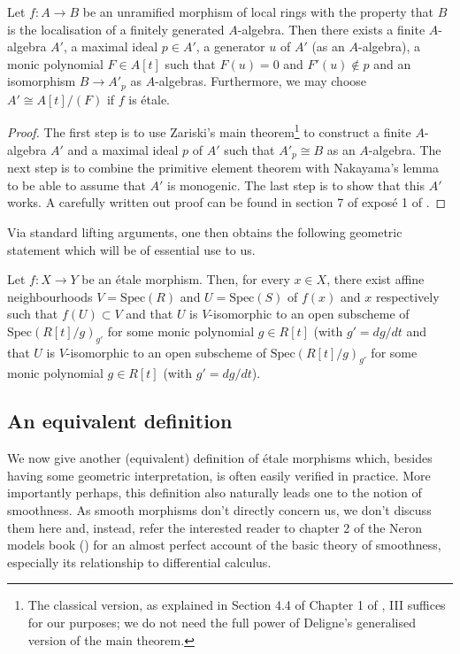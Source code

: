 \begin{theorem}
\label{theorem-structure-etale}
Let $f:A \to B$ be an unramified morphism of local rings with the property
that $B$ is the localisation of a finitely generated $A$-algebra. Then there
exists a finite $A$-algebra $A'$, a maximal ideal $p \in A'$, a generator
$u$ of $A'$ (as an $A$-algebra), a monic polynomial $F \in A[t]$ such that
$F(u) = 0$ and $F'(u) \notin p$ and an isomorphism $B \to A'_p$ as
$A$-algebras. Furthermore, we may choose $A' \cong A[t]/(F)$ if $f$
is \'etale.
\end{theorem}

\begin{proof}
The first step is to use Zariski's main
theorem\footnote{The classical version, as explained in Section 4.4 of
Chapter 1 of \cite{EGA}, III suffices for our purposes; we do not need the
full power of Deligne's generalised version of the main theorem.} to
construct a finite $A$-algebra $A'$ and a maximal ideal $p$ of $A'$ such
that $A'_p \cong B$ as an $A$-algebra. The next step is to combine the
primitive element theorem with Nakayama's lemma to be able to assume that
$A'$ is monogenic. The last step is to show that this $A'$ works. A
carefully written out proof can be found in section 7 of expos\'e 1 of
\cite{SGA1}.
\end{proof}

\noindent
Via standard lifting arguments, one then obtains the following geometric
statement which will be of essential use to us.

\begin{theorem}
\label{theorem-geometric-structure}
Let $f:X \to Y$ be an \'etale morphism. Then, for every $x \in X$, there
exist affine neighbourhoods $V = \text{Spec}(R)$ and $U = \text{Spec}(S)$ of $f(x)$
and $x$ respectively such that $f(U) \subset V$ and that $U$ is $V$-isomorphic
to an open subscheme of $\text{Spec}(R[t]/g)_{g'}$ for some monic polynomial
$g \in R[t]$  (with $g' = dg/dt$ and that $U$ is $V$-isomorphic to an open
subscheme of $\text{Spec}(R[t]/g)_{g'}$ for some monic polynomial $g \in R[t]$
(with $g' = dg/dt$).
\end{theorem}

\subsection{An equivalent definition}
\label{subsection-definition-equivalent}

\noindent
We now give another (equivalent) definition of \'etale morphisms which,
besides having some geometric interpretation, is often easily verified in
practice. More importantly perhaps, this definition also naturally leads
one to the notion of smoothness. As smooth morphisms don't directly concern
us, we don't discuss them here and, instead, refer the interested reader to
chapter 2 of the Neron models book (\cite{Ner}) for an almost perfect
account of the basic theory of smoothness, especially its relationship to
differential calculus.

